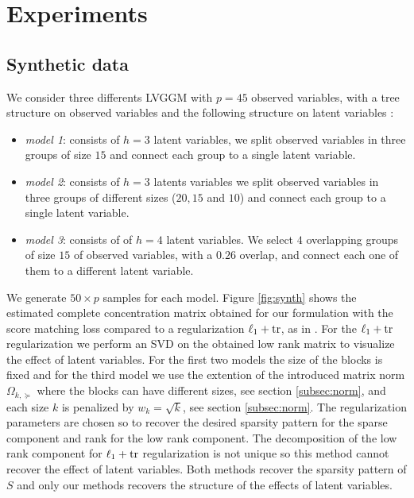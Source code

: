 \section{Experiments}
\label{experiments}

\subsection{Synthetic data}

We consider three differents LVGGM with $p=45$ observed variables, with a tree structure on observed variables and the following structure on latent variables :
\begin{itemize}
\item \textit{model 1}: consists of $h=3$ latent variables, we split observed variables in three groups of size $15$ and connect each group to a single latent variable.
\item \textit{model 2}: consists of $h=3$ latents variables we split observed variables in three groups of different sizes ($20,15$ and $10$) and connect each group to a single latent variable.
\item \textit{model 3}: consists of of $h=4$ latent variables. We select $4$ overlapping groups of size $15$ of observed variables, with a $0.26$ overlap, and connect each one of them to a different latent variable.
\end{itemize}


We generate $50\times p$ samples for each model. Figure \ref{fig:synth} shows the estimated complete concentration matrix obtained for our formulation with the score matching loss compared to a regularization $\ell_1+{\rm tr}$, as in \citet{chandrasekaran2010}. For  the $\ell_1+{\rm tr}$ regularization we perform an SVD on the obtained low rank matrix to visualize the effect of latent variables. For the first two models the size of the blocks is fixed and for the third model we use the extention of the introduced matrix norm $\Omega_{k,\succeq}$ where the blocks can have different sizes, see section \ref{subsec:norm},  and each size $k$ is penalized by $w_{k}=\sqrt{k}$, see section \ref{subsec:norm}. The regularization parameters are chosen so to recover the desired sparsity pattern for the sparse component and rank for the low rank component.  The decomposition of the low rank component for $\ell_1+{\rm tr}$ regularization is not unique so this method cannot recover the effect of latent variables. Both methods recover the sparsity pattern of $S$ and only our methods recovers the structure of the effects of latent variables.


